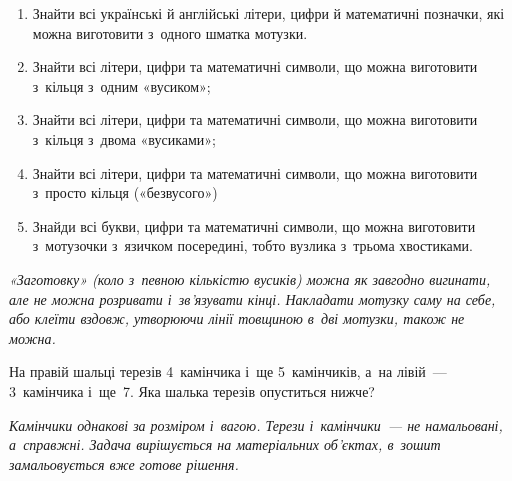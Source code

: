 \begin{enumerate}
    \item Знайти всі українські й англійські літери, цифри
    й математичні позначки, які можна виготовити з~одного шматка мотузки.
    \item Знайти всі літери, цифри та математичні символи,
    що можна виготовити з~кільця з~одним «вусиком»;
    \item Знайти всі літери, цифри та математичні символи,
    що можна виготовити з~кільця з~двома «вусиками»;
    \item Знайти всі літери, цифри та математичні символи,
    що можна виготовити з~просто кільця («безвусого»)
    \item Знайди всі букви, цифри та математичні символи,
    що можна виготовити з~мотузочки з~язичком посередині,
    тобто вузлика з~трьома хвостиками.
\end{enumerate}

\emph{
«Заготовку» (коло з~певною кількістю вусиків) можна як завгодно вигинати,
але не можна розривати і~зв'язувати кінці.
Накладати мотузку саму на себе, або клеїти вздовж,
утворюючи лінії товщиною в~дві мотузки, також не можна.
}


\problem
На правій шальці терезів 4~камінчика і~ще 5~камінчиків,
а~на лівій~--- 3~камінчика і~ще~7.
Яка шалька терезів опуститься нижче? 

\emph{
Камінчики однакові за розміром і~вагою.
Терези і~камінчики~--- не намальовані, а~справжні.
Задача вирішується на матеріальних об’єктах,
в~зошит замальовується вже готове рішення.
}


